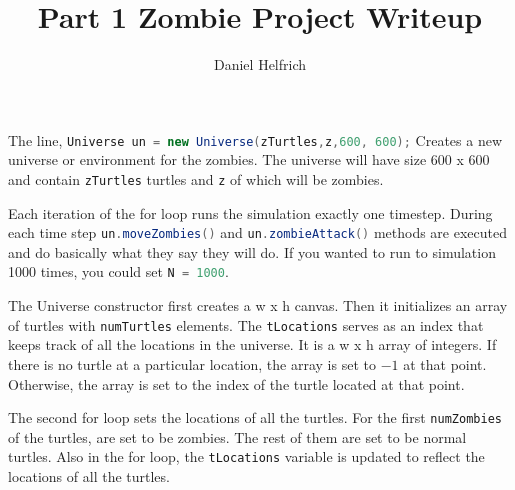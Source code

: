 \documentclass[12pt]{article}
\newcommand{\lstJava}[1]{\lstinline[language=Java,breaklines=true,basicstyle= \listingsfontinline]$#1$}
\newenvironment{question}[2][Question]{\begin{trivlist}
\item[\hskip \labelsep {\bfseries #1}\hskip \labelsep {\bfseries #2.}]}{\end{trivlist}}
\begin{document}
 
 
\title{Part 1 Zombie Project Writeup}
\author{Daniel Helfrich}
\maketitle
 
\begin{question}{1}
	
	The line, \lstJava{Universe un = new Universe(zTurtles,z,600, 600);}
	Creates a new universe or environment for the zombies. The universe
	will have size 600 x 600 and contain \lstJava{zTurtles} turtles and
	\lstJava{z} of which will be zombies.	

\end{question}

\begin{question}{2}
	Each iteration of the for loop runs the simulation exactly one 
	timestep. During each time step \lstJava{un.moveZombies()} and 
	\lstJava{un.zombieAttack()} methods are executed and do basically
	what they say they will do. If you wanted to run to simulation 1000
	times, you could set \lstJava{N = 1000}.
	
\end{question}

\begin{question}{3}
	The Universe constructor first creates a w x h canvas. Then it initializes an array of turtles with 
	\lstJava{numTurtles} elements. The \lstJava{tLocations} serves as an index that keeps track of all the 
	locations in the universe. It is a w x h array of integers. If there is no turtle at a particular 
	location, the array is set to $-1$ at that point. Otherwise, the array is set to the index of the turtle
	located at that point.

	The second for loop sets the locations of all the turtles. For the first \lstJava{numZombies} of the 
	turtles, are set to be zombies. The rest of them are set to be normal turtles. Also in the for loop, the 
	\lstJava{tLocations} variable is updated to reflect the locations of all the turtles.

	
\end{question}
\end{document}

